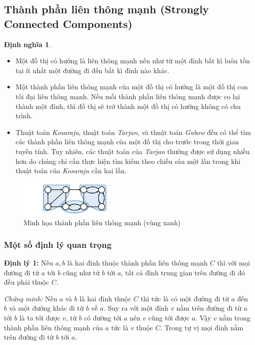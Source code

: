\documentclass{article}
\newtheorem{dinhnghia}{Định nghĩa}
\begin{document}
\subsection{Thành phần liên thông mạnh (Strongly Connected Components)}

\begin{dinhnghia}
    
\end{dinhnghia}
 
\begin{itemize}
    \item Một đồ thị có hướng là liên thông mạnh nếu như từ một đỉnh bất kì luôn tồn tại ít nhất một đường đi đến bất kì đỉnh nào khác.
    \item Một thành phần liên thông mạnh của một đồ thị có hướng là một đồ thị con tối đại liên thông mạnh. Nếu mỗi thành phần liên thông mạnh được co lại thành một đỉnh, thì đồ thị sẽ trở thành một đồ thị có hướng không có chu trình.
    \item Thuật toán \textit{Kosaraju}, thuật toán \textit{Tarjan}, và thuật toán \textit{Gabow} đều có thể tìm các thành phần liên thông mạnh của một đồ thị cho trước trong thời gian tuyến tính. Tuy nhiên, các thuật toán của \textit{Tarjan} thường được sử dụng nhiều hơn do chúng chỉ cần thực hiện tìm kiếm theo chiều sâu một lần trong khi thuật toán của \textit{Kosaraju} cần hai lần.
\end{itemize}

\begin{figure}[h]
    \centering
    \includegraphics[width=0.4\textwidth]{img/b5/Depth-First-Search-Tree_img14.png}
    \caption{Minh họa thành phần liên thông mạnh (vùng xanh)}
\end{figure}

\subsubsection*{Một số định lý quan trọng}

\textbf{Định lý 1:} Nếu $a, b$ là hai đỉnh thuộc thành phần liên thông mạnh $C$ thì với mọi đường đi từ $a$ tới $b$ cũng như từ $b$ tới $a$, tất cả đỉnh trung gian trên đường đi đó đều phải thuộc $C$.

\textit{Chứng minh:} Nếu $a$ và $b$ là hai đỉnh thuộc $C$ thì tức là có một đường đi từ $a$ đến $b$ và một đường khác đi từ $b$ về $a$. Suy ra với một đỉnh $v$ nằm trên đường đi từ $a$ tới $b$ là ta tới được $v$, từ $b$ có đường tới $a$ nên $v$ cũng tới được $a$. Vậy $v$ nằm trong thành phần liên thông mạnh của $a$ tức là $v$ thuộc $C$. Trong tự vị mọi đỉnh nằm trên đường đi từ $b$ tới $a$.
\end{document}
